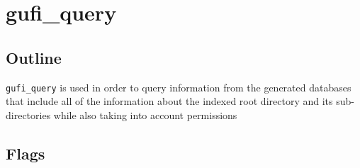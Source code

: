\section{gufi\_query}

\subsection{Outline}

\texttt{gufi\_query} is used in order to query information from the generated databases that include all of the information about the indexed root directory and its sub-directories while also taking into account permissions 
\subsection{Flags}

